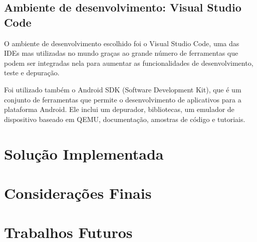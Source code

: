 \documentclass[12pt]{article}
\begin{document}
\subsection{Ambiente de desenvolvimento: Visual Studio Code}
O ambiente de desenvolvimento escolhido foi o Visual Studio Code, uma das IDEs mas utilizadas no mundo graças ao grande número de ferramentas que podem ser integradas nela para aumentar as funcionalidades de desenvolvimento, teste e depuração.

Foi utilizado também o Android SDK (Software Development Kit), que é um conjunto de ferramentas que permite o desenvolvimento de aplicativos para a plataforma Android. Ele inclui um depurador, bibliotecas, um emulador de dispositivo baseado em QEMU, documentação, amostras de código e tutoriais.

\section{Solução Implementada}
\section{Considerações Finais}
\section{Trabalhos Futuros}
\end{document}
